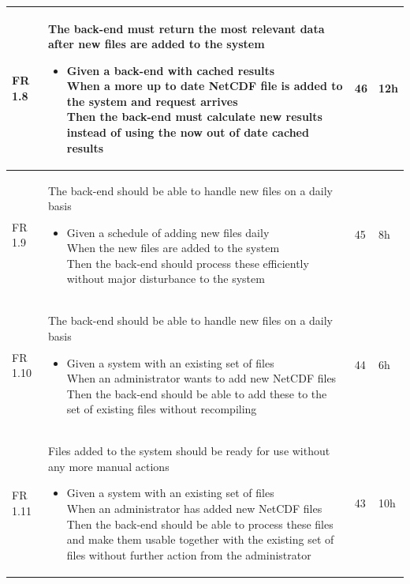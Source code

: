 \documentclass[11pt,a4paper,titlepage,oneside]{report}
\begin{document}
\begin{longtable}{p{1.4cm} p{7.8cm} p{1cm} p{1cm} }
  FR 1.8 & The back-end must return the most relevant data after new files are added to the system
  \begin{itemize}
  \item \parbox[t]{6.8cm}{
        Given a back-end with cached results \\
        When a more up to date NetCDF file is added to the system and request arrives \\
        Then the back-end must calculate new results instead of using the now out of date cached results}
  \end{itemize}
  & 46 & 12h \\ \hline

  FR 1.9 & The back-end should be able to handle new files on a daily basis
  \begin{itemize}
  \item \parbox[t]{6.8cm}{
        Given a schedule of adding new files daily \\
        When the new files are added to the system \\
        Then the back-end should process these efficiently without major disturbance to the system}
  \end{itemize}
  & 45 & 8h \\ \hline

  FR 1.10 & The back-end should be able to handle new files on a daily basis
  \begin{itemize}
  \item \parbox[t]{6.8cm}{
        Given a system with an existing set of files \\
        When an administrator wants to add new NetCDF files \\
        Then the back-end should be able to add these to the set of existing files without recompiling}
  \end{itemize}
  & 44 & 6h \\ \hline

  FR 1.11 & Files added to the system should be ready for use without any more manual actions
  \begin{itemize}
  \item \parbox[t]{6.8cm}{
        Given a system with an existing set of files \\
        When an administrator has added new NetCDF files \\
        Then the back-end should be able to process these files and make them usable together with the existing set of files without further action from the administrator}
  \end{itemize}
  & 43 & 10h \\ \hline


\end{longtable}
\end{document}
